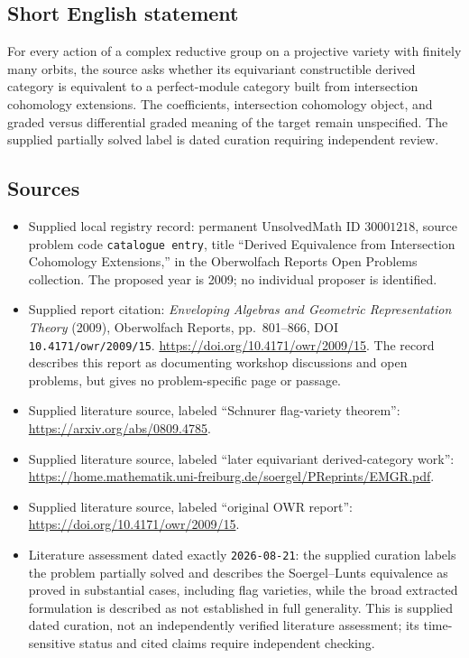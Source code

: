 \documentclass[11pt]{article}
\begin{document}
\subsection{Short English statement}
For every action of a complex reductive group on a projective variety with finitely many orbits, the source asks whether its equivariant constructible derived category is equivalent to a perfect-module category built from intersection cohomology extensions. The coefficients, intersection cohomology object, and graded versus differential graded meaning of the target remain unspecified. The supplied partially solved label is dated curation requiring independent review.
\subsection{Sources}
\begin{itemize}
\item Supplied local registry record: permanent UnsolvedMath ID \(30001218\), source problem code \texttt{catalogue entry}, title ``Derived Equivalence from Intersection Cohomology Extensions,'' in the Oberwolfach Reports Open Problems collection. The proposed year is 2009; no individual proposer is identified.
\item Supplied report citation: \emph{Enveloping Algebras and Geometric Representation Theory} (2009), Oberwolfach Reports, pp.\ 801--866, DOI \texttt{10.4171/owr/2009/15}. \url{https://doi.org/10.4171/owr/2009/15}. The record describes this report as documenting workshop discussions and open problems, but gives no problem-specific page or passage.
\item Supplied literature source, labeled ``Schnurer flag-variety theorem'': \url{https://arxiv.org/abs/0809.4785}.
\item Supplied literature source, labeled ``later equivariant derived-category work'': \url{https://home.mathematik.uni-freiburg.de/soergel/PReprints/EMGR.pdf}.
\item Supplied literature source, labeled ``original OWR report'': \url{https://doi.org/10.4171/owr/2009/15}.
\item Literature assessment dated exactly \texttt{2026-08-21}: the supplied curation labels the problem partially solved and describes the Soergel--Lunts equivalence as proved in substantial cases, including flag varieties, while the broad extracted formulation is described as not established in full generality. This is supplied dated curation, not an independently verified literature assessment; its time-sensitive status and cited claims require independent checking.
\end{itemize}
\end{document}

